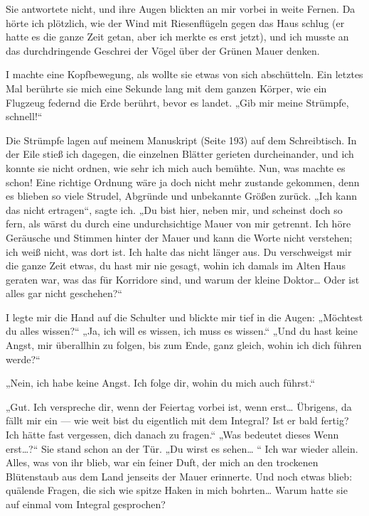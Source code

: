 Sie antwortete nicht, und ihre Augen blickten an mir vorbei in
weite Fernen. Da hörte ich plötzlich, wie der Wind mit
Riesenflügeln gegen das Haus schlug (er hatte es die ganze Zeit
getan, aber ich merkte es erst jetzt), und ich musste an das
durchdringende Geschrei der Vögel über der Grünen Mauer denken.

I machte eine Kopfbewegung, als wollte sie etwas von sich
abschütteln. Ein letztes Mal berührte sie mich eine Sekunde lang
mit dem ganzen Körper, wie ein Flugzeug federnd die Erde berührt,
bevor es landet. „Gib mir meine Strümpfe, schnell!“

Die Strümpfe lagen auf meinem Manuskript (Seite 193) auf dem
Schreibtisch. In der Eile stieß ich dagegen, die einzelnen Blätter
gerieten durcheinander, und ich konnte sie nicht ordnen, wie sehr
ich mich auch bemühte. Nun, was machte es schon! Eine richtige
Ordnung wäre ja doch nicht mehr zustande gekommen, denn es blieben
so viele Strudel, Abgründe und unbekannte Größen zurück. „Ich kann
das nicht ertragen“, sagte ich. „Du bist hier, neben mir, und
scheinst doch so fern, als wärst du durch eine undurchsichtige
Mauer von mir getrennt. Ich höre Geräusche und Stimmen hinter der
Mauer und kann die Worte nicht verstehen; ich weiß nicht, was dort
ist. Ich halte das nicht länger aus. Du verschweigst mir die ganze
Zeit etwas, du hast mir nie gesagt, wohin ich damals im Alten Haus
geraten war, was das für Korridore sind, und warum der kleine
Doktor\ldots{} Oder ist alles gar nicht geschehen?“

I legte mir die Hand auf die Schulter und blickte mir tief in die
Augen: „Möchtest du alles wissen?“ „Ja, ich will es wissen, ich
muss es wissen.“ „Und du hast keine Angst, mir überallhin zu
folgen, bis zum Ende, ganz gleich, wohin ich dich führen werde?“

„Nein, ich habe keine Angst. Ich folge dir, wohin du mich auch
führst.“

„Gut. Ich verspreche dir, wenn der Feiertag vorbei ist, wenn
erst\ldots{} Übrigens, da fällt mir ein — wie weit bist du eigentlich
mit dem Integral? Ist er bald fertig? Ich hätte fast vergessen,
dich danach zu fragen.“ „Was bedeutet dieses \glq{}Wenn
erst\ldots{}\grq{}?“ Sie stand schon an der Tür. „Du wirst es
sehen\ldots{} “ Ich war wieder allein. Alles, was von ihr blieb, war ein
feiner Duft, der mich an den trockenen Blütenstaub aus dem Land
jenseits der Mauer erinnerte. Und noch etwas blieb: quälende
Fragen, die sich wie spitze Haken in mich bohrten\ldots{} Warum hatte
sie auf einmal vom Integral gesprochen?

